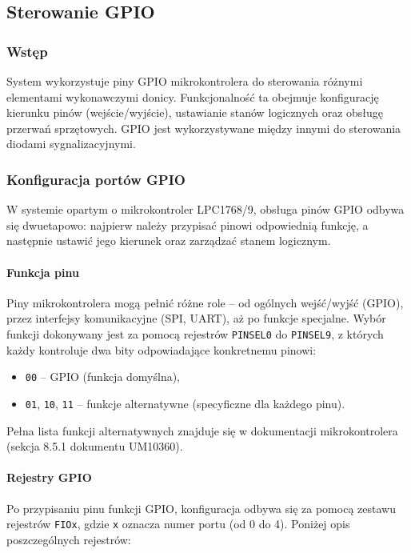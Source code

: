 \subsection{Sterowanie GPIO}

\subsubsection{Wstęp}
System wykorzystuje piny GPIO mikrokontrolera do sterowania różnymi elementami wykonawczymi donicy. Funkcjonalność ta obejmuje konfigurację kierunku pinów (wejście/wyjście), ustawianie stanów logicznych oraz obsługę przerwań sprzętowych. GPIO jest wykorzystywane między innymi do sterowania diodami sygnalizacyjnymi.

\subsubsection{Konfiguracja portów GPIO}

W systemie opartym o mikrokontroler LPC1768/9, obsługa pinów GPIO odbywa się dwuetapowo: najpierw należy przypisać pinowi odpowiednią funkcję, a następnie ustawić jego kierunek oraz zarządzać stanem logicznym.

\paragraph{Funkcja pinu}

Piny mikrokontrolera mogą pełnić różne role – od ogólnych wejść/wyjść (GPIO), przez interfejsy komunikacyjne (SPI, UART), aż po funkcje specjalne. Wybór funkcji dokonywany jest za pomocą rejestrów \texttt{PINSEL0} do \texttt{PINSEL9}, z których każdy kontroluje dwa bity odpowiadające konkretnemu pinowi:

\begin{itemize}
    \item \texttt{00} – GPIO (funkcja domyślna),
    \item \texttt{01}, \texttt{10}, \texttt{11} – funkcje alternatywne (specyficzne dla każdego pinu).
\end{itemize}

Pełna lista funkcji alternatywnych znajduje się w dokumentacji mikrokontrolera (sekcja 8.5.1 dokumentu UM10360).

\paragraph{Rejestry GPIO}
\label{gpio}
Po przypisaniu pinu funkcji GPIO, konfiguracja odbywa się za pomocą zestawu rejestrów \texttt{FIOx}, gdzie \texttt{x} oznacza numer portu (od 0 do 4). Poniżej opis poszczególnych rejestrów:

